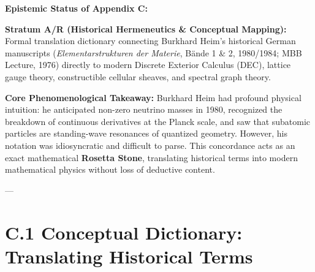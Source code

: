 \documentclass[
    12pt,
    a4paper,
    headings=normal,
    twoside=false,
    open=any,
    parskip=half
]{scrbook}
\begin{document}
\begin{firewallbox}
\textbf{Epistemic Status of Appendix C:}\par\smallskip\noindent
\textbf{Stratum A/R (Historical Hermeneutics \& Conceptual Mapping):} Formal translation dictionary connecting Burkhard Heim's historical German manuscripts (\textit{Elementarstrukturen der Materie}, B\"{a}nde 1 \& 2, 1980/1984; MBB Lecture, 1976) directly to modern Discrete Exterior Calculus (DEC), lattice gauge theory, constructible cellular sheaves, and spectral graph theory.\par\smallskip\noindent
\textbf{Core Phenomenological Takeaway:} Burkhard Heim had profound physical intuition: he anticipated non-zero neutrino masses in 1980, recognized the breakdown of continuous derivatives at the Planck scale, and saw that subatomic particles are standing-wave resonances of quantized geometry. However, his notation was idiosyncratic and difficult to parse. This concordance acts as an exact mathematical \textbf{Rosetta Stone}, translating historical terms into modern mathematical physics without loss of deductive content.
\end{firewallbox}

---

\section{C.1 Conceptual Dictionary: Translating Historical Terms}
\label{sec:appC_conceptual_dictionary}
\end{document}
